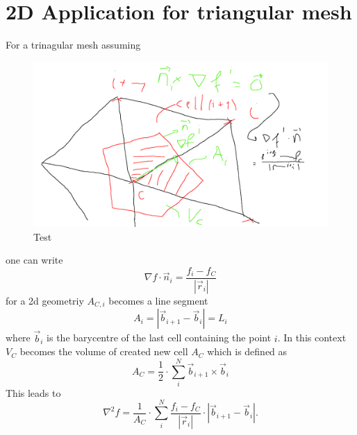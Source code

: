 \section{2D Application for triangular mesh}
For a trinagular mesh assuming
\begin{figure}[ht]
    \label{fig:rod_heat_transfer}
    \centering
    \includegraphics[width=0.8\linewidth]{draft.png}
    \caption{Test}
\end{figure}
one can write
\begin{equation}
  \nabla f \cdot \vec{n}_i = \frac{f_{i} - f_C}{|\vec{r}_{i}|}
\end{equation}
for a 2d geometriy $A_{C, i}$ becomes a line segment
\begin{equation}
  A_{i} = |\vec{b}_{i + 1} - \vec{b}_{i}| = L_i
\end{equation}
where $\vec{b}_i$ is the barycentre of the last cell containing the point $i$.
In this context $V_C$ becomes the volume of created new cell $A_C$ which is defined as
\begin{equation}
  A_C = \frac{1}{2} \cdot \sum_i^N  \vec{b}_{i + 1} \times \vec{b}_{i}
\end{equation}
This leads to
\begin{equation}
  \nabla^2 f = \frac{1}{A_C} \cdot \sum_i^N \frac{f_{i} - f_C}{|\vec{r}_{i}|} \cdot |\vec{b}_{i + 1} - \vec{b}_{i}| .
\end{equation}

